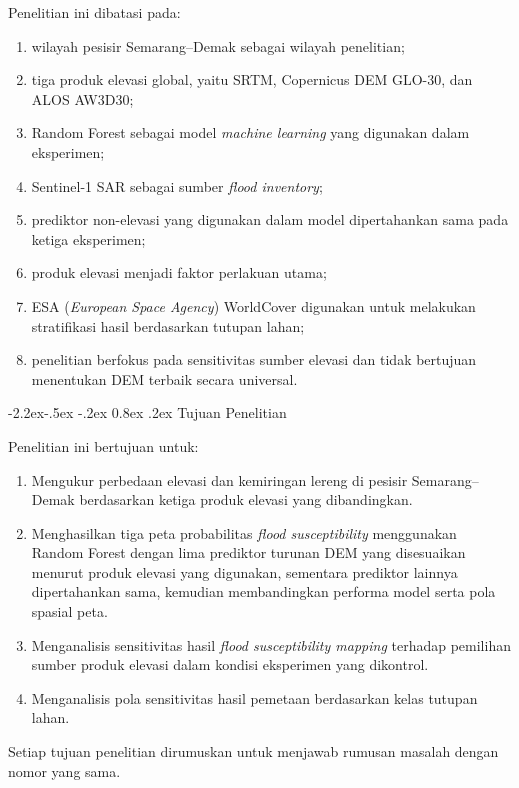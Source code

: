 \documentclass[12pt,a4paper]{article}
\makeatletter
\renewcommand\subsection{\@startsection{subsection}{2}{\z@}%
  {-2.2ex\@plus -.5ex \@minus -.2ex}%
  {0.8ex \@plus .2ex}%
  {\normalfont\normalsize\bfseries}}
\makeatother
\begin{document}
Penelitian ini dibatasi pada:

\begin{enumerate}
\item wilayah pesisir Semarang--Demak sebagai wilayah penelitian;
\item tiga produk elevasi global, yaitu SRTM, Copernicus DEM GLO-30, dan
ALOS AW3D30;
\item Random Forest sebagai model \textit{machine learning} yang digunakan
dalam eksperimen;
\item Sentinel-1 SAR sebagai sumber \textit{flood inventory};
\item prediktor non-elevasi yang digunakan dalam model dipertahankan sama
pada ketiga eksperimen;
\item produk elevasi menjadi faktor perlakuan utama;
\item ESA (\textit{European Space Agency}) WorldCover digunakan untuk
melakukan stratifikasi hasil berdasarkan tutupan lahan;
\item penelitian berfokus pada sensitivitas sumber elevasi dan tidak
bertujuan menentukan DEM terbaik secara universal.
\end{enumerate}

\subsection{Tujuan Penelitian}

Penelitian ini bertujuan untuk:

\begin{enumerate}
\item Mengukur perbedaan elevasi dan kemiringan lereng di pesisir
Semarang--Demak berdasarkan ketiga produk elevasi yang dibandingkan.
\item Menghasilkan tiga peta probabilitas \textit{flood susceptibility}
menggunakan Random Forest dengan lima prediktor turunan DEM yang
disesuaikan menurut produk elevasi yang digunakan, sementara prediktor
lainnya dipertahankan sama, kemudian membandingkan performa model serta pola
spasial peta.
\item Menganalisis sensitivitas hasil \textit{flood susceptibility mapping}
terhadap pemilihan sumber produk elevasi dalam kondisi eksperimen yang
dikontrol.
\item Menganalisis pola sensitivitas hasil pemetaan berdasarkan kelas
tutupan lahan.
\end{enumerate}

Setiap tujuan penelitian dirumuskan untuk menjawab rumusan masalah dengan
nomor yang sama.
\end{document}
